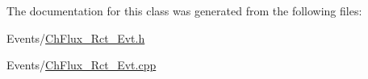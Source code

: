 The documentation for this class was generated from the following files\+:\begin{DoxyCompactItemize}
\item 
Events/\hyperlink{_ch_flux___rct___evt_8h}{Ch\+Flux\+\_\+\+Rct\+\_\+\+Evt.\+h}\item 
Events/\hyperlink{_ch_flux___rct___evt_8cpp}{Ch\+Flux\+\_\+\+Rct\+\_\+\+Evt.\+cpp}\end{DoxyCompactItemize}
